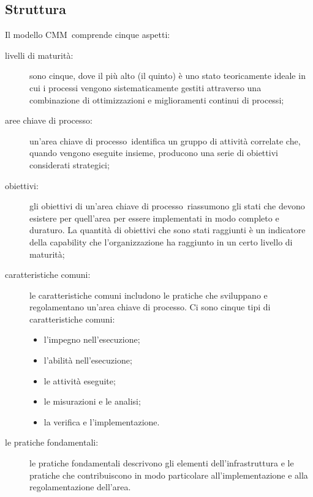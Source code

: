 \documentclass[../PianoDiQualifica.tex]{subfiles}
\begin{document}
\begin{appendices}
	\subsection{Struttura}
	Il modello CMM\g\ comprende cinque aspetti:
	\begin{description}
		\item[livelli di maturità:] sono cinque, dove il più alto (il quinto) è uno stato teoricamente ideale in cui i processi vengono sistematicamente gestiti attraverso una combinazione di ottimizzazioni e miglioramenti continui di processi;
		\item[aree chiave di processo\g:] un'area chiave di processo\g\ identifica un gruppo di attività correlate che, quando vengono eseguite insieme, producono una serie di obiettivi considerati strategici;
		\item[obiettivi:] gli obiettivi di un'area chiave di processo\g\ riassumono gli stati che devono esistere per quell'area per essere implementati in modo completo e duraturo. La quantità di obiettivi che sono stati raggiunti è un indicatore della capability che l'organizzazione ha raggiunto in un certo livello di maturità;
		\item[caratteristiche comuni:] le caratteristiche comuni includono le pratiche che sviluppano e regolamentano un'area chiave di processo\g. Ci sono cinque tipi di caratteristiche comuni:
		\begin{itemize}
			\item l'impegno nell'esecuzione;
			\item l'abilità nell'esecuzione;
			\item le attività eseguite;
			\item le misurazioni e le analisi;
			\item la verifica e l'implementazione.
		\end{itemize}
		\item[le pratiche fondamentali:] le pratiche fondamentali descrivono gli elementi dell'infrastruttura e le pratiche che contribuiscono in modo particolare all'implementazione e alla regolamentazione dell'area.
	\end{description}

\end{appendices}
\end{document}
